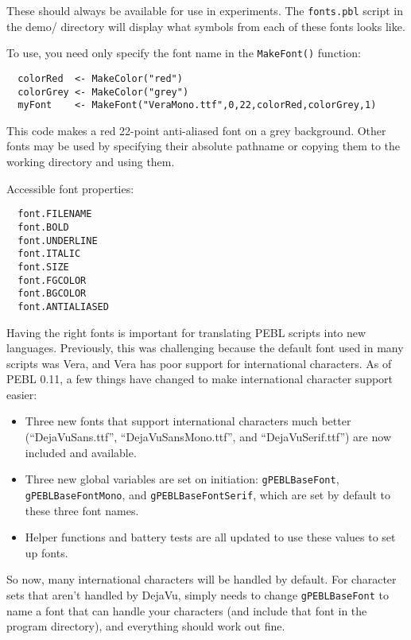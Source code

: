 These should always be available for use in experiments.  The
\texttt{fonts.pbl} script in the demo/ directory will display what
symbols from each of these fonts looks like.

To use, you need only specify the font name in the \texttt{MakeFont()} function:
\begin{verbatim}
  colorRed  <- MakeColor("red")
  colorGrey <- MakeColor("grey")
  myFont    <- MakeFont("VeraMono.ttf",0,22,colorRed,colorGrey,1)
\end{verbatim}
This code makes a red 22-point anti-aliased font on a grey background. 
Other fonts may be used by specifying their absolute pathname 
or copying them to the working directory and using them.



Accessible font properties:
\begin{verbatim}
  font.FILENAME
  font.BOLD
  font.UNDERLINE
  font.ITALIC
  font.SIZE
  font.FGCOLOR
  font.BGCOLOR
  font.ANTIALIASED
\end{verbatim}
 

Having the right fonts is important for translating PEBL scripts into
new languages.  Previously, this was challenging because the default
font used in many scripts was Vera, and Vera has poor support for international
characters. As of  PEBL 0.11, a few things have changed to make
international character support easier:
\begin{itemize}
\item Three new fonts that support international characters much
  better (``DejaVuSans.ttf'', ``DejaVuSansMono.ttf'', and
  ``DejaVuSerif.ttf'') are now included and available.
\item Three new global variables are set on initiation:
  \texttt{gPEBLBaseFont}, \\ \texttt{gPEBLBaseFontMono}, and
  \texttt{gPEBLBaseFontSerif}, which are set by default to these
  three font names.
\item Helper functions and battery tests are all updated to use these
  values to set up fonts.
\end{itemize}

So now, many international characters will be handled by default.  For
character sets that aren't handled by DejaVu, simply needs to change
\texttt{gPEBLBaseFont} to name a font that can handle your characters
(and include that font in the program directory), and everything
should work out fine.


